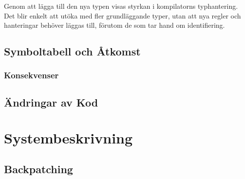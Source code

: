 			Genom att lägga till den nya typen visas styrkan i kompilatorns typhantering. Det blir enkelt att utöka med fler grundläggande typer, utan att nya regler och hanteringar behöver läggas till, förutom de som tar hand om identifiering.

	\subsection{Symboltabell och Åtkomst}

		\subsubsection{Konsekvenser}

	\subsection{Ändringar av Kod}



\section{Systembeskrivning}
	\subsection{Backpatching}
